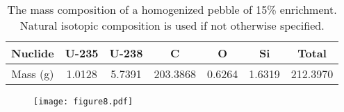 \documentclass[preprint,final]{elsarticle}
\begin{document}
\begin{table}[!htbp]
\centering
\caption{The mass composition of a homogenized pebble of 15\% enrichment. Natural isotopic composition is used if not otherwise specified.}
\label{table:pebble_composition}
\begin{tabular}{|c|c|c|c|c|c|c|}
\hline
Nuclide  & U-235  & U-238  & C        & O      & Si     & Total    \\ \hline
Mass (g) & 1.0128 & 5.7391 & 203.3868 & 0.6264 & 1.6319 & 212.3970 \\ \hline
\end{tabular}
\end{table}

\begin{figure}[!htbp]
    \centering
    \texttt{[image: figure8.pdf]}
    \caption{}
    \label{fig:NMC_804}
\end{figure}
\end{document}
